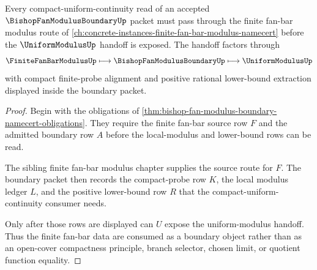 \begin{theorem}
\label{thm:bishop-fan-modulus-boundary-finite-fan-handoff}
Every compact-uniform-continuity read of an accepted $\BishopFanModulusBoundaryUp$ packet must pass through the finite fan-bar modulus route of \autoref{ch:concrete-instances-finite-fan-bar-modulus-namecert} before the $\UniformModulusUp$ handoff is exposed. The handoff factors through
$$
\FiniteFanBarModulusUp \longmapsto \BishopFanModulusBoundaryUp \longmapsto \UniformModulusUp
$$
with compact finite-probe alignment and positive rational lower-bound extraction displayed inside the boundary packet.
\end{theorem}
\begin{proof}
Begin with the obligations of \autoref{thm:bishop-fan-modulus-boundary-namecert-obligations}. They require the finite fan-bar source row $F$ and the admitted boundary row $A$ before the local-modulus and lower-bound rows can be read.

The sibling finite fan-bar modulus chapter supplies the source route for $F$. The boundary packet then records the compact-probe row $K$, the local modulus ledger $L$, and the positive lower-bound row $R$ that the compact-uniform-continuity consumer needs.

Only after those rows are displayed can $U$ expose the uniform-modulus handoff. Thus the finite fan-bar data are consumed as a boundary object rather than as an open-cover compactness principle, branch selector, chosen limit, or quotient function equality.
\end{proof}


\begin{closurestatus}{\BishopFanModulusBoundaryUp}
  \theoryclosure{\seedClosure}
  \formalstatus{\unformalizedV}
\end{closurestatus}
